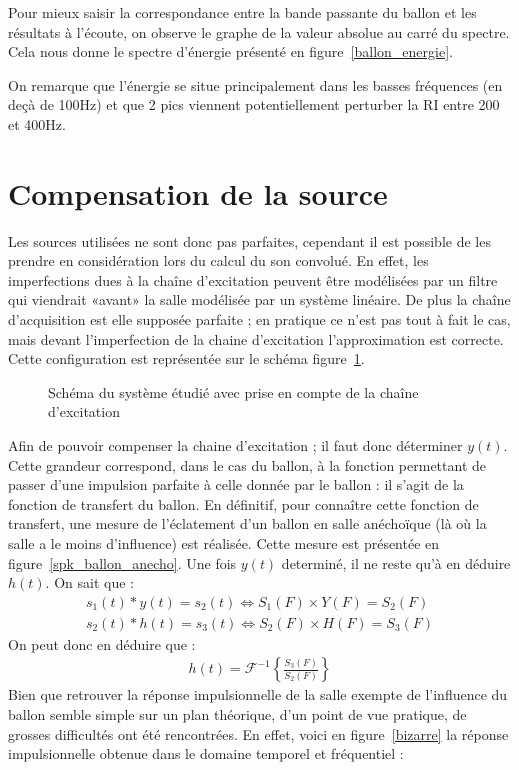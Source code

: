 Pour mieux saisir la correspondance entre la bande passante du ballon et les résultats à l'écoute, on observe le graphe
de la valeur absolue au carré du spectre. Cela nous donne le spectre d'énergie présenté en figure~\ref{ballon_energie}.

On remarque que l'énergie se situe principalement dans les basses fréquences (en deçà de 100Hz) et que 2 pics viennent
potentiellement perturber la RI entre 200 et 400Hz.

\section{Compensation de la source} %

Les sources utilisées ne sont donc pas parfaites, cependant il est possible de les prendre en considération lors du calcul du son convolué.
En effet, les imperfections dues à la chaîne d'excitation peuvent être modélisées par un filtre qui viendrait «avant» la salle modélisée par un système linéaire. De plus la chaîne d'acquisition est elle supposée parfaite ; en pratique ce n'est pas tout à fait le cas, mais devant l'imperfection de la chaine d'excitation l'approximation est correcte. Cette configuration est représentée sur le schéma figure~\ref{compensation}.
\begin{figure}[h!]
\caption{\label{compensation}Schéma du système étudié avec prise en compte de la chaîne d'excitation}
\end{figure}
Afin de pouvoir compenser la chaine d'excitation ; il faut donc déterminer $y(t)$. Cette grandeur correspond, dans le
cas du ballon, à la fonction permettant de passer d'une impulsion parfaite à celle donnée par le ballon : il s'agit de
la fonction de transfert du ballon. En définitif, pour connaître cette fonction de transfert, une mesure de l'éclatement d'un ballon en salle anéchoïque (là où la salle a le moins d'influence) est réalisée. Cette mesure est présentée en figure~\ref{spk_ballon_anecho}.
Une fois $y(t)$ determiné, il ne reste qu'à en déduire $h(t)$.
On sait que :
\begin{eqnarray*}
s_1 (t) \ast y(t) = s_2 (t) \Leftrightarrow S_1 (F) \times Y(F) = S_2 (F)\\
s_2 (t) \ast h (t) = s_3 (t) \Leftrightarrow S_2 (F) \times H(F) = S_3 (F)
\end{eqnarray*}
On peut donc en déduire que :
\begin{eqnarray*}
h(t) = \mathcal{F}^{-1}\left\{ \frac{S_3 (F)}{S_2(F)}\right\} 
\end{eqnarray*}
Bien que retrouver la réponse impulsionnelle de la salle exempte de l'influence du ballon semble simple sur un plan
théorique, d'un point de vue pratique, de grosses difficultés ont été rencontrées. En effet, voici en
figure~\ref{bizarre} la réponse impulsionnelle obtenue dans le domaine temporel et fréquentiel : 

